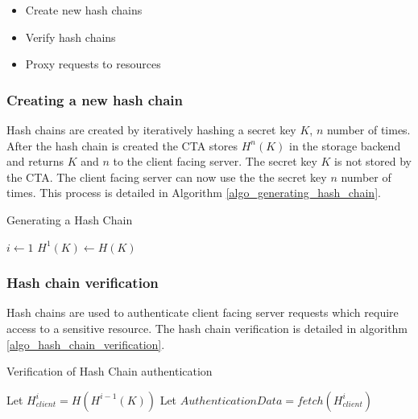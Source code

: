 \documentclass[a4paper,twoside]{article}
\begin{document}
\begin{itemize}
\item Create new hash chains
\item Verify hash chains
\item Proxy requests to resources
\end{itemize}

\subsubsection{Creating a new hash chain}
Hash chains are created by iteratively hashing a secret key $K$, $n$ number of times. 
After the hash chain is created the CTA stores $H^{n}(K)$ in the storage backend and returns $K$ and $n$ to the client facing server. The secret key $K$ is not stored by the CTA. The client facing server can now use the the secret key $n$ number of times. This process is detailed in Algorithm  \ref{algo_generating_hash_chain}.

\begin{algorithm}
\SetAlgoLined
\caption{Generating a Hash Chain}
\label{algo_generating_hash_chain}
\LinesNumbered
{}
$i \leftarrow 1 $\;
$H^{1}(K) \leftarrow H(K)$ \;
 \;
\end{algorithm}
\subsubsection{Hash chain verification}
Hash chains are used to authenticate client facing server requests which require access to a sensitive resource. The hash chain verification is detailed in algorithm \ref{algo_hash_chain_verification}.

\begin{algorithm}
\label{algo_hash_chain_verification}
\SetAlgoLined
\caption{Verification of Hash Chain authentication}
\LinesNumbered
{}
	Let $H_{client}^{i} = H(H^{i-1}(K))$ \;
	Let $AuthenticationData = fetch(H_{client}^{i})$ \;
	
\end{algorithm}
\end{document}
